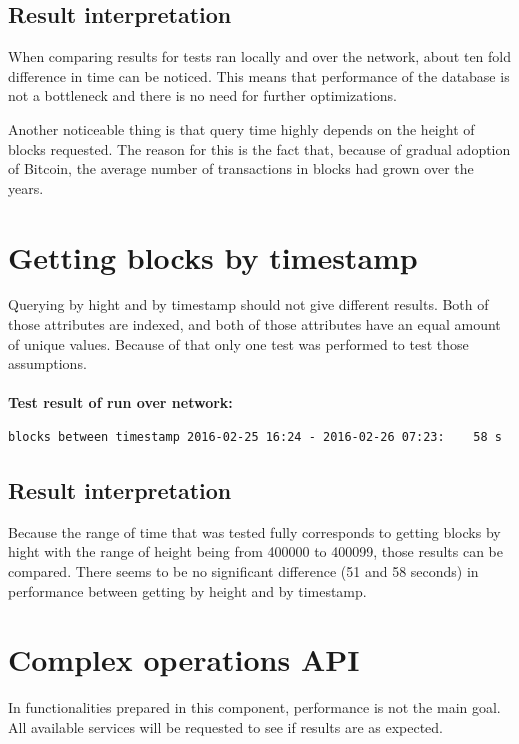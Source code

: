\documentclass[12pt, en, eng, twoside, final]{mgr}
\begin{document}
\subsection{Result interpretation}
When comparing results for tests ran locally and over the network, about ten fold difference in time can be noticed. This means that performance of the database is not a bottleneck and there is no need for further optimizations.

Another noticeable thing is that query time highly depends on the height of blocks requested. The reason for this is the fact that, because of gradual adoption of Bitcoin, the average number of transactions in blocks had grown over the years. 

\section{Getting blocks by timestamp}
Querying by hight and by timestamp should not give different results. Both of those attributes are indexed, and both of those attributes have an equal amount of unique values. Because of that only one test was performed to test those assumptions.
\\
\\
\textbf{Test result of run over network:}
\begin{verbatim}
blocks between timestamp 2016-02-25 16:24 - 2016-02-26 07:23:    58 s
\end{verbatim}

\subsection{Result interpretation}
Because the range of time that was tested fully corresponds to getting blocks by hight with the range of height being from 400000 to 400099, those results can be compared. There seems to be no significant difference (51 and 58 seconds) in performance between getting by height and by timestamp.

\section{Complex operations API}
In functionalities prepared in this component, performance is not the main goal. All available services will be requested to see if results are as expected.
\end{document}
